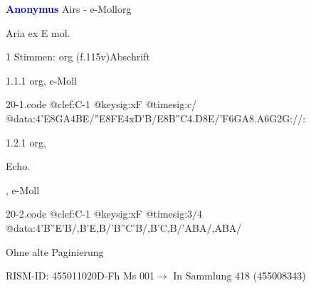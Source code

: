 \documentclass[twocolumn]{book}
\begin{document}
\par \vspace{7pt} \textcolor{darkblue}{\textbf{Anonymus  }}\hfillplus{\textbf{[20]}}\newline Airs - e-Moll\newline org
\par \begin{itshape}[f.115v, heading:] Aria ex E mol.\end{itshape} 
\par \textcolor{darkblue}{}  1 Stimmen: org  (f.115v)\newline Abschrift
\par 1.1.1  org, e-Moll  
\begin{filecontents*}{20-1.code}
@clef:C-1
@keysig:xF
@timesig:c/
@data:4'E{8GA}4BE/''E{8FE}4xD'B/E{8B''C}4.D8E/{'F6GA}{8.A6G}2G://:
\end{filecontents*}
\newline
%
\par 1.2.1  org, \begin{itshape}Echo.\end{itshape}, e-Moll  
\begin{filecontents*}{20-2.code}
@clef:C-1
@keysig:xF
@timesig:3/4
@data:4'B''E'B/,B'E,B/'B''C'B/,B'C,B/'ABA/,ABA/
\end{filecontents*}
\newline
%
\par Ohne alte Paginierung
\par RISM-ID: 455011020\newline D-Fh  Ms 001\newline $\rightarrow$ In Sammlung 418 (455008343)
      
\end{document}
